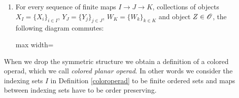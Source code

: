 \begin{defin}
\begin{enumerate}
            \begin{center}
            \end{center}
        \item For every sequence of finite maps $I \to J \to K$, collections of
        objects $X_I = \{X_i\}_{i \in I}$, $Y_J = \{Y_j\}_{j \in J}$, $W_K =
        \{W_k\}_{k \in K}$ and object $Z \in \mathscr{O}$, the following diagram
        commutes:
        \begin{center}
        \begin{adjustbox}{max width=\textwidth}
            \end{adjustbox}
        \end{center}
    \end{enumerate}
\end{defin}

\begin{rem}
    When we drop the symmetric structure we obtain a definition of a colored
    operad, which we call \emph{colored planar operad}. In other words we
    consider the indexing sets $I$ in Definition \ref{coloroperad} to be finite
    ordered sets and maps between indexing sets have to be order preserving.
\end{rem}

